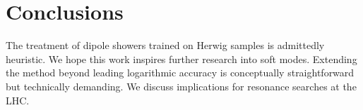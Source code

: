 \section{Conclusions}\label{sec:conclusions}

The treatment of dipole showers trained on Herwig samples is admittedly
heuristic. We hope this work inspires further research into soft modes.
Extending the method beyond leading logarithmic accuracy is conceptually
straightforward but technically demanding. We discuss implications for
resonance searches at the LHC.

